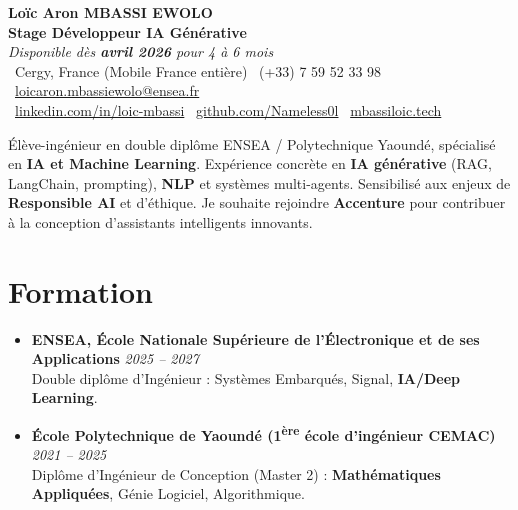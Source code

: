 \documentclass[a4paper,11pt]{article}
\begin{document}
\begin{center}
    {\Large \textbf{Loïc Aron MBASSI EWOLO}} \\ \vspace{4pt}
    \textbf{\large Stage Développeur IA Générative} \\
    \textit{\small Disponible dès \textbf{avril 2026} pour 4 à 6 mois} \\ \vspace{4pt}
    \small
    \faMapMarker\ Cergy, France (Mobile France entière) \quad
    \faPhone\ (+33) 7 59 52 33 98 \quad
    \faEnvelope\ \href{mailto:loicaron.mbassiewolo@ensea.fr}{loicaron.mbassiewolo@ensea.fr} \\ \vspace{2pt}
    \faLinkedin\ \href{https://www.linkedin.com/in/loic-mbassi/}{linkedin.com/in/loic-mbassi} \quad
    \faGithub\ \href{https://github.com/Nameless0l}{github.com/Nameless0l} \quad
    \faGlobe\ \href{https://mbassiloic.tech}{mbassiloic.tech}
\end{center}

\vspace{-6pt}

\noindent\small{Élève-ingénieur en double diplôme ENSEA / Polytechnique Yaoundé, spécialisé en \textbf{IA et Machine Learning}. Expérience concrète en \textbf{IA générative} (RAG, LangChain, prompting), \textbf{NLP} et systèmes multi-agents. Sensibilisé aux enjeux de \textbf{Responsible AI} et d'éthique. Je souhaite rejoindre \textbf{Accenture} pour contribuer à la conception d'assistants intelligents innovants.}

\section{Formation}
\begin{itemize}[leftmargin=*, label=\tiny$\bullet$, nosep]
    \item \textbf{ENSEA, École Nationale Supérieure de l'Électronique et de ses Applications} \hfill \textit{2025 -- 2027} \\
    \small{Double diplôme d'Ingénieur : Systèmes Embarqués, Signal, \textbf{IA/Deep Learning}.}
    \item \textbf{École Polytechnique de Yaoundé (1\textsuperscript{ère} école d'ingénieur CEMAC)} \hfill \textit{2021 -- 2025} \\
    \small{Diplôme d'Ingénieur de Conception (Master 2) : \textbf{Mathématiques Appliquées}, Génie Logiciel, Algorithmique.}
\end{itemize}
\end{document}
